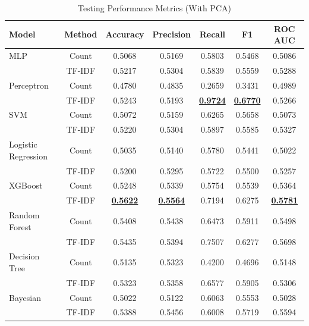 \begin{table}[H]
    \centering
    \caption{Testing Performance Metrics (With PCA)}
    \label{tab:pca-testing}
    \begin{tabular}{|l|c|c|c|c|c|c|}
        \hline
        \textbf{Model} & \textbf{Method} & \textbf{Accuracy} & \textbf{Precision} & \textbf{Recall} & \textbf{F1} & \textbf{ROC AUC} \\
        \hline
        MLP & Count & 0.5068 & 0.5169 & 0.5803 & 0.5468 & 0.5086 \\
        & TF-IDF & 0.5217 & 0.5304 & 0.5839 & 0.5559 & 0.5288 \\
        \hline
        Perceptron & Count & 0.4780 & 0.4835 & 0.2659 & 0.3431 & 0.4989 \\
        & TF-IDF & 0.5243 & 0.5193 & \textbf{\underline{0.9724}} & \textbf{\underline{0.6770}} & 0.5266 \\
        \hline
        SVM & Count & 0.5072 & 0.5159 & 0.6265 & 0.5658 & 0.5073 \\
        & TF-IDF & 0.5220 & 0.5304 & 0.5897 & 0.5585 & 0.5327 \\
        \hline
        Logistic Regression & Count & 0.5035 & 0.5140 & 0.5780 & 0.5441 & 0.5022 \\
        & TF-IDF & 0.5200 & 0.5295 & 0.5722 & 0.5500 & 0.5257 \\
        \hline
        XGBoost & Count & 0.5248 & 0.5339 & 0.5754 & 0.5539 & 0.5364 \\
        & TF-IDF & \textbf{\underline{0.5622}} & \textbf{\underline{0.5564}} & 0.7194 & 0.6275 & \textbf{\underline{0.5781}} \\
        \hline
        Random Forest & Count & 0.5408 & 0.5438 & 0.6473 & 0.5911 & 0.5498 \\
        & TF-IDF & 0.5435 & 0.5394 & 0.7507 & 0.6277 & 0.5698 \\
        \hline
        Decision Tree & Count & 0.5135 & 0.5323 & 0.4200 & 0.4696 & 0.5148 \\
        & TF-IDF & 0.5323 & 0.5358 & 0.6577 & 0.5905 & 0.5306 \\
        \hline
        Bayesian & Count & 0.5022 & 0.5122 & 0.6063 & 0.5553 & 0.5028 \\
        & TF-IDF & 0.5388 & 0.5456 & 0.6008 & 0.5719 & 0.5594 \\
        \hline
    \end{tabular}
\end{table}

